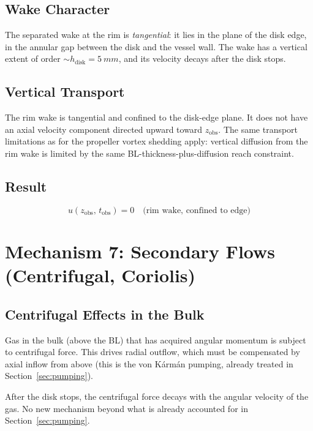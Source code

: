 \documentclass[11pt,a4paper]{article}
\begin{document}
\subsection{Wake Character}

The separated wake at the rim is \emph{tangential}: it lies in the
plane of the disk edge, in the annular gap between the disk and the
vessel wall. The wake has a vertical extent of order $\sim h_\mathrm{disk}
= \SI{5}{mm}$, and its velocity decays after the disk stops.

\subsection{Vertical Transport}

The rim wake is tangential and confined to the disk-edge plane. It does
not have an axial velocity component directed upward toward
$z_\mathrm{obs}$. The same transport limitations as for the propeller
vortex shedding apply: vertical diffusion from the rim wake is limited
by the same BL-thickness-plus-diffusion reach constraint.

\subsection{Result}

\begin{equation}
  \boxed{u(z_\mathrm{obs},\, t_\mathrm{obs})
    = 0 \quad \text{(rim wake, confined to edge)}}
\end{equation}


\section{Mechanism 7: Secondary Flows (Centrifugal, Coriolis)}
\label{sec:secondary}

\subsection{Centrifugal Effects in the Bulk}

Gas in the bulk (above the BL) that has acquired angular momentum is
subject to centrifugal force. This drives radial outflow, which must
be compensated by axial inflow from above (this is the von K\'arm\'an
pumping, already treated in Section~\ref{sec:pumping}).

After the disk stops, the centrifugal force decays with the angular
velocity of the gas. No new mechanism beyond what is already accounted
for in Section~\ref{sec:pumping}.
\end{document}
